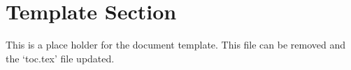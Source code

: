 \section{Template Section}

	This is a place holder for the document template.  This file can be removed and the `toc.tex' file updated.